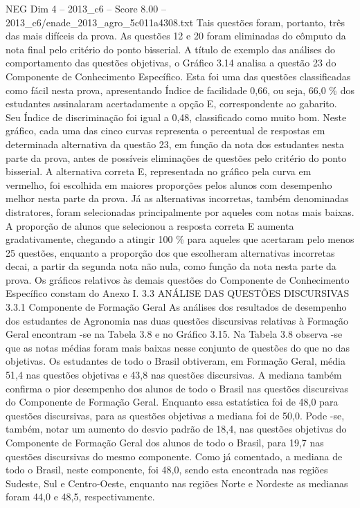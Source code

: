\begin{textsample}{NEG Dim 4 – 2013\_c6 – Score 8.00 – 2013\_c6/enade\_2013\_agro\_5c011a4308.txt}
Tais questões foram, portanto, três das mais difíceis da prova.
As questões 12 e 20 foram eliminadas do cômputo da nota final pelo critério do ponto bisserial.
A título de exemplo das análises do comportamento das questões objetivas, o Gráfico 3.14 analisa a questão 23 do Componente de Conhecimento Específico.
Esta foi uma das questões classificadas como fácil nesta prova, apresentando Índice de facilidade 0,66, ou seja, 66,0 \% dos estudantes assinalaram acertadamente a opção E, correspondente ao gabarito.
Seu Índice de discriminação foi igual a 0,48, classificado como muito bom.
Neste gráfico, cada uma das cinco curvas representa o percentual de respostas em determinada alternativa da questão 23, em função da nota dos estudantes nesta parte da prova, antes de possíveis eliminações de questões pelo critério do ponto bisserial.
A alternativa correta E, representada no gráfico pela curva em vermelho, foi escolhida em maiores proporções pelos alunos com desempenho melhor nesta parte da prova.
Já as alternativas incorretas, também denominadas distratores, foram selecionadas principalmente por aqueles com notas mais baixas.
A proporção de alunos que selecionou a resposta correta E aumenta gradativamente, chegando a atingir 100 \% para aqueles que acertaram pelo menos 25 questões, enquanto a proporção dos que escolheram alternativas incorretas decai, a partir da segunda nota não nula, como função da nota nesta parte da prova.
Os gráficos relativos às demais questões do Componente de Conhecimento Específico constam do Anexo I. 3.3 ANÁLISE DAS QUESTÕES DISCURSIVAS 3.3.1 Componente de Formação Geral As análises dos resultados de desempenho dos estudantes de Agronomia nas duas questões discursivas relativas à Formação Geral encontram -se na Tabela 3.8 e no Gráfico 3.15.
Na Tabela 3.8 observa -se que as notas médias foram mais baixas nesse conjunto de questões do que no das objetivas.
Os estudantes de todo o Brasil obtiveram, em Formação Geral, média 51,4 nas questões objetivas e 43,8 nas questões discursivas.
A mediana também confirma o pior desempenho dos alunos de todo o Brasil nas questões discursivas do Componente de Formação Geral.
Enquanto essa estatística foi de 48,0 para questões discursivas, para as questões objetivas a mediana foi de 50,0.
Pode -se, também, notar um aumento do desvio padrão de 18,4, nas questões objetivas do Componente de Formação Geral dos alunos de todo o Brasil, para 19,7 nas questões discursivas do mesmo componente.
Como já comentado, a mediana de todo o Brasil, neste componente, foi 48,0, sendo esta encontrada nas regiões Sudeste, Sul e Centro-Oeste, enquanto nas regiões Norte e Nordeste as medianas foram 44,0 e 48,5, respectivamente.

\end{textsample}
